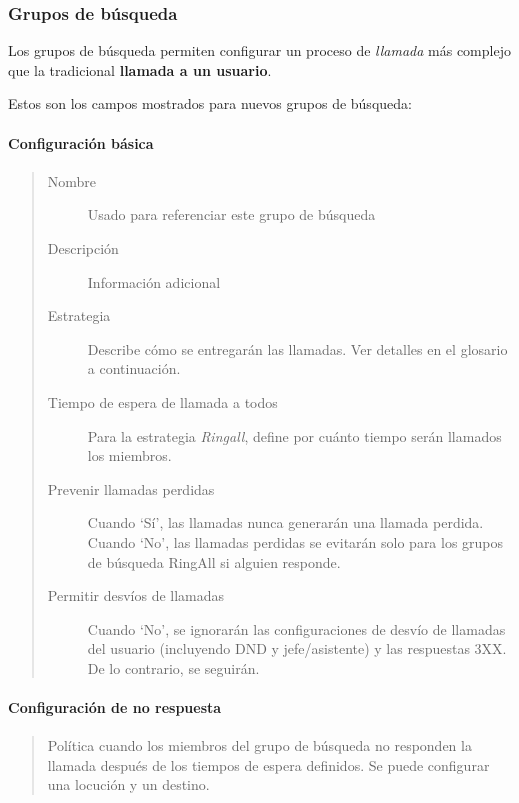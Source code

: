 \documentclass[letterpaper,10pt,spanish]{sphinxmanual}
\begin{document}
\subsubsection{Grupos de búsqueda}
\label{administration_portal/client/vpbx/routing_endpoints/hunt_groups:hunt-groups}\label{administration_portal/client/vpbx/routing_endpoints/hunt_groups::doc}\label{administration_portal/client/vpbx/routing_endpoints/hunt_groups:huntgroups}
Los grupos de búsqueda permiten configurar un proceso de \emph{llamada} más complejo que la tradicional \textbf{llamada a un usuario}.

Estos son los campos mostrados para nuevos grupos de búsqueda:


\paragraph{Configuración básica}
\label{administration_portal/client/vpbx/routing_endpoints/hunt_groups:basic-configuration}\begin{quote}
\begin{description}
\item[{Nombre}] \leavevmode
Usado para referenciar este grupo de búsqueda

\item[{Descripción}] \leavevmode
Información adicional

\item[{Estrategia}] \leavevmode
Describe cómo se entregarán las llamadas. Ver detalles en el glosario a continuación.

\item[{Tiempo de espera de llamada a todos}] \leavevmode
Para la estrategia \emph{Ringall}, define por cuánto tiempo serán llamados los miembros.

\item[{Prevenir llamadas perdidas}] \leavevmode
Cuando `Sí', las llamadas nunca generarán una llamada perdida. Cuando `No', las llamadas perdidas se evitarán solo para los grupos de búsqueda RingAll si alguien responde.

\item[{Permitir desvíos de llamadas}] \leavevmode
Cuando `No', se ignorarán las configuraciones de desvío de llamadas del usuario (incluyendo DND y jefe/asistente) y las respuestas 3XX. De lo contrario, se seguirán.

\end{description}
\end{quote}


\paragraph{Configuración de no respuesta}
\label{administration_portal/client/vpbx/routing_endpoints/hunt_groups:no-answer-configuration}\begin{quote}

Política cuando los miembros del grupo de búsqueda no responden la llamada después de los tiempos de espera definidos. Se puede configurar una locución y un destino.
\end{quote}
\end{document}

